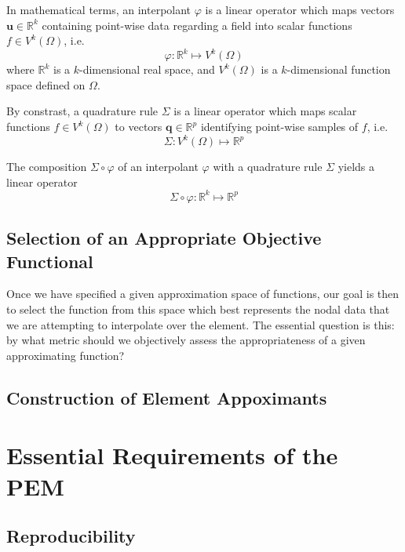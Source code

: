 In mathematical terms, an interpolant $\varphi$ is a linear operator which maps vectors $\mathbf{u} \in \mathbb{R}^k$ containing point-wise data regarding a field into scalar functions $f \in V^k (\Omega)$, i.e.
\begin{equation}
  \varphi \colon \mathbb{R}^k \mapsto V^k (\Omega)
\end{equation}
where $\mathbb{R}^k$ is a $k$-dimensional real space, and $V^k (\Omega)$ is a $k$-dimensional function space defined on $\Omega$.

By constrast, a quadrature rule $\Sigma$ is a linear operator which maps scalar functions $f \in V^k (\Omega)$ to vectors $\mathbf{q} \in \mathbb{R}^p$ identifying point-wise samples of $f$, i.e.
\begin{equation}
  \Sigma \colon V^k (\Omega) \mapsto \mathbb{R}^p
\end{equation}

The composition $\Sigma \circ \varphi$ of an interpolant $\varphi$ with a quadrature rule $\Sigma$ yields a linear operator
\begin{equation}
  \Sigma \circ \varphi \colon \mathbb{R}^k \mapsto \mathbb{R}^p
\end{equation}

\subsection{Selection of an Appropriate Objective Functional}

Once we have specified a given approximation space of functions, our goal is then to select the function from this space which best represents the nodal data that we are attempting to interpolate over the element. The essential question is this: by what metric should we objectively assess the appropriateness of a given approximating function?

\subsection{Construction of Element Appoximants}

\section{Essential Requirements of the PEM}
\subsection{Reproducibility}

